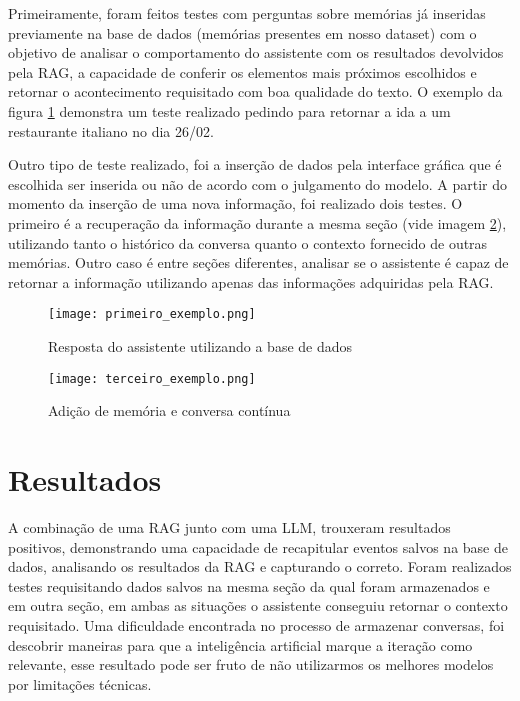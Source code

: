 \documentclass[conference]{IEEEtran}
\begin{document}
Primeiramente, foram feitos testes com perguntas sobre memórias já inseridas previamente na base de dados (memórias presentes em nosso dataset) com o objetivo de analisar o comportamento do assistente com os resultados devolvidos pela RAG, a capacidade de conferir os elementos mais próximos escolhidos e retornar o acontecimento requisitado com boa qualidade do texto. O exemplo da figura \ref{fig:primeiro_exemplo} demonstra um teste realizado pedindo para retornar a ida a um restaurante italiano no dia 26/02.

Outro tipo de teste realizado, foi a inserção de dados pela interface gráfica que é escolhida ser inserida ou não de acordo com o julgamento do modelo. A partir do momento da inserção de uma nova informação, foi realizado dois testes. O primeiro é a recuperação da informação durante a mesma seção (vide imagem \ref{fig:add_mem}), utilizando tanto o histórico da conversa quanto o contexto fornecido de outras memórias. Outro caso é entre seções diferentes, analisar se o assistente é capaz de retornar a informação utilizando apenas das informações adquiridas pela RAG. 

\begin{figure}[h]
    \centering
    \texttt{[image: primeiro\_exemplo.png]}
    \caption{Resposta do assistente utilizando a base de dados}
    \label{fig:primeiro_exemplo}
\end{figure}

\begin{figure}[h]
    \centering
    \texttt{[image: terceiro\_exemplo.png]}
    \caption{Adição de memória e conversa contínua}
    \label{fig:add_mem}
\end{figure}


\section{Resultados}

A combinação de uma RAG junto com uma LLM, trouxeram resultados positivos, demonstrando uma capacidade de recapitular eventos salvos na base de dados, analisando os resultados da RAG e capturando o correto. Foram realizados testes requisitando dados salvos na mesma seção da qual foram armazenados e em outra seção, em ambas as situações o assistente conseguiu retornar o contexto requisitado.
Uma dificuldade encontrada no processo de armazenar conversas, foi descobrir maneiras para que a inteligência artificial marque a iteração como relevante, esse resultado pode ser fruto de não utilizarmos os melhores modelos por limitações técnicas.
\end{document}

